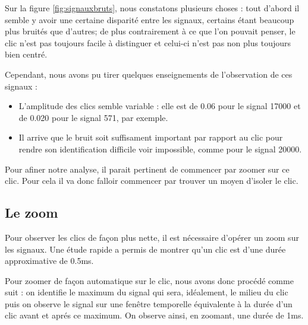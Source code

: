 Sur la figure \ref{fig:signauxbruts}, nous constatons plusieurs choses : tout d'abord il semble y avoir une certaine disparité entre les signaux, certains étant beaucoup plus bruités que d'autres; de plus contrairement à ce que l'on pouvait penser, le clic n'est pas toujours facile à distinguer et celui-ci n'est pas non plus toujours bien centré.

Cependant, nous avons pu tirer quelques enseignements de l'observation de ces signaux :
\begin{itemize}
\item L'amplitude des clics semble variable : elle est de 0.06 pour le signal 17000 et de 0.020 pour le signal 571, par exemple.
\item Il arrive que le bruit soit suffisament important par rapport au clic pour rendre son identification difficile voir impossible, comme pour le signal 20000.
\end{itemize}

Pour afiner notre analyse, il parait pertinent de commencer par zoomer sur ce clic.
Pour cela il va donc falloir commencer par trouver un moyen d'isoler le clic.

\hypertarget{Le-zoom}{%
\subsection{Le zoom}
\label{Le-zoom}}

Pour observer les clics de façon plus nette, il est nécessaire d'opérer un zoom
sur les signaux. Une étude rapide a permis de montrer qu'un clic
est d'une durée approximative de 0.5ms.

Pour zoomer de façon automatique sur le clic, nous avons donc procédé comme
suit :
on identifie le maximum du signal qui sera, idéalement, le milieu du clic puis
on observe le signal sur une fenêtre temporelle équivalente à la durée d'un clic
avant et aprés ce maximum. On observe ainsi, en zoomant, une durée de 1ms.


